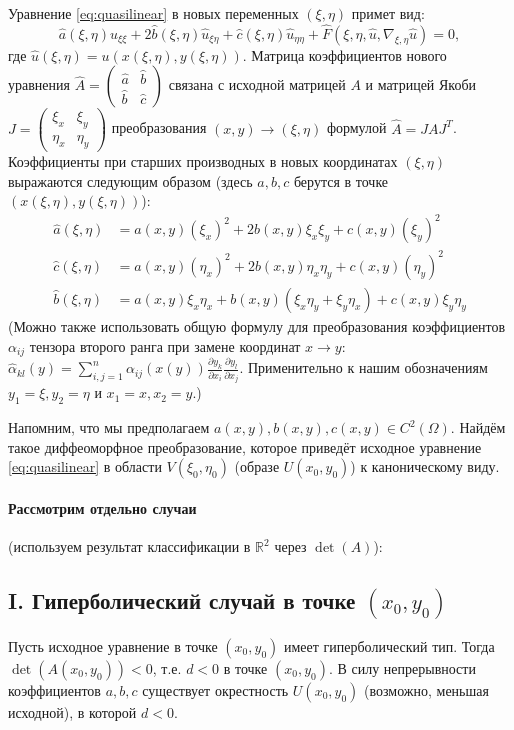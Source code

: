 \documentclass[12pt, a4paper]{article}
\begin{document}
Уравнение \eqref{eq:quasilinear} в новых переменных $(\xi, \eta)$ примет вид:
\[
    \hat{a}(\xi,\eta) \hat{u}_{\xi\xi} + 2\hat{b}(\xi,\eta) \hat{u}_{\xi\eta} + \hat{c}(\xi,\eta) \hat{u}_{\eta\eta} + \hat{F}(\xi, \eta, \hat{u}, \nabla_{\xi,\eta} \hat{u}) = 0,
\]
где $\hat{u}(\xi,\eta) = u(x(\xi,\eta), y(\xi,\eta))$.
Матрица коэффициентов нового уравнения $\hat{A} = \begin{pmatrix} \hat{a} & \hat{b} \\ \hat{b} & \hat{c} \end{pmatrix}$ связана с исходной матрицей $A$ и матрицей Якоби $J = \begin{pmatrix} \xi_x & \xi_y \\ \eta_x & \eta_y \end{pmatrix}$ преобразования $(x,y) \to (\xi,\eta)$ формулой $\hat{A} = J A J^T$.
Коэффициенты при старших производных в новых координатах $(\xi, \eta)$ выражаются следующим образом (здесь $a,b,c$ берутся в точке $(x(\xi,\eta), y(\xi,\eta))$):
\begin{align*}
    \hat{a}(\xi,\eta) &= a(x,y) (\xi_x)^2 + 2b(x,y) \xi_x \xi_y + c(x,y) (\xi_y)^2 \\
    \hat{c}(\xi,\eta) &= a(x,y) (\eta_x)^2 + 2b(x,y) \eta_x \eta_y + c(x,y) (\eta_y)^2 \\
    \hat{b}(\xi,\eta) &= a(x,y) \xi_x \eta_x + b(x,y) (\xi_x \eta_y + \xi_y \eta_x) + c(x,y) \xi_y \eta_y
\end{align*}
(Можно также использовать общую формулу для преобразования коэффициентов $\alpha_{ij}$ тензора второго ранга при замене координат $x \to y$:
$ \hat{\alpha}_{kl}(y) = \sum_{i,j=1}^n \alpha_{ij}(x(y)) \frac{\partial y_k}{\partial x_i} \frac{\partial y_l}{\partial x_j} $. Применительно к нашим обозначениям $y_1=\xi, y_2=\eta$ и $x_1=x, x_2=y$.)

Напомним, что мы предполагаем $a(x,y), b(x,y), c(x,y) \in C^2(\Omega)$. Найдём такое диффеоморфное преобразование, которое приведёт исходное уравнение \eqref{eq:quasilinear} в области $V(\xi_0, \eta_0)$ (образе $U(x_0,y_0)$) к каноническому виду.

\paragraph{Рассмотрим отдельно случаи} (используем результат классификации в $\mathbb{R}^2$ через $\det(A)$):

\subsection*{I. Гиперболический случай в точке $(x_0, y_0)$}
Пусть исходное уравнение в точке $(x_0, y_0)$ имеет гиперболический тип. Тогда $\det(A(x_0, y_0)) < 0$, т.е. $d < 0$ в точке $(x_0, y_0)$.
В силу непрерывности коэффициентов $a, b, c$ существует окрестность $U(x_0, y_0)$ (возможно, меньшая исходной), в которой $d < 0$.
\end{document}
